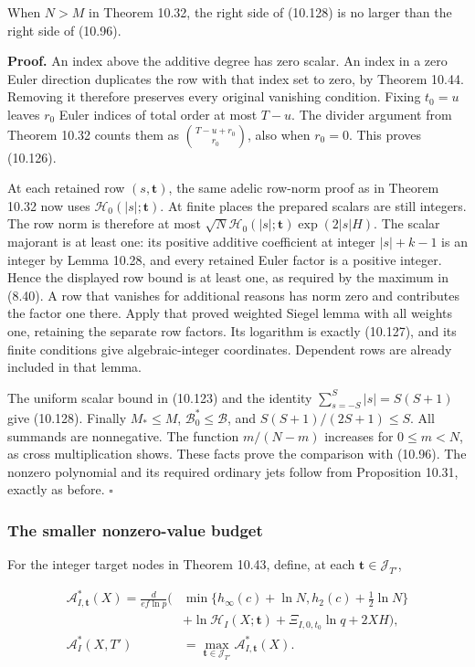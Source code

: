 \documentclass[
  11pt,
  a4paper,
]{article}
\begin{document}
When \(N>M\) in Theorem 10.32, the right side of (10.128) is no larger
than the right side of (10.96).

\textbf{Proof.} An index above the additive degree has zero scalar. An
index in a zero Euler direction duplicates the row with that index set
to zero, by Theorem 10.44. Removing it therefore preserves every
original vanishing condition. Fixing \(t_0=u\) leaves \(r_0\) Euler
indices of total order at most \(T-u\). The divider argument from
Theorem 10.32 counts them as \(\binom{T-u+r_0}{r_0}\), also when
\(r_0=0\). This proves (10.126).

At each retained row \((s,\boldsymbol t)\), the same adelic row-norm
proof as in Theorem 10.32 now uses \(\mathcal H_0(|s|;\boldsymbol t)\).
At finite places the prepared scalars are still integers. The row norm
is therefore at most
\(\sqrt N\mathcal H_0(|s|;\boldsymbol t)\exp(2|s|H)\). The scalar
majorant is at least one: its positive additive coefficient at integer
\(|s|+k-1\) is an integer by Lemma 10.28, and every retained Euler
factor is a positive integer. Hence the displayed row bound is at least
one, as required by the maximum in (8.40). A row that vanishes for
additional reasons has norm zero and contributes the factor one there.
Apply that proved weighted Siegel lemma with all weights one, retaining
the separate row factors. Its logarithm is exactly (10.127), and its
finite conditions give algebraic-integer coordinates. Dependent rows are
already included in that lemma.

The uniform scalar bound in (10.123) and the identity
\(\sum_{s=-S}^S|s|=S(S+1)\) give (10.128). Finally \(M_*\le M\),
\(\mathcal B_0^*\le\mathcal B\), and \(S(S+1)/(2S+1)\le S\). All
summands are nonnegative. The function \(m/(N-m)\) increases for
\(0\le m<N\), as cross multiplication shows. These facts prove the
comparison with (10.96). The nonzero polynomial and its required
ordinary jets follow from Proposition 10.31, exactly as before.
\(\square\)

\subsubsection{The smaller nonzero-value
budget}\label{the-smaller-nonzero-value-budget}

For the integer target nodes in Theorem 10.43, define, at each
\(\boldsymbol t\in\mathcal J_{T'}\),

\[
\begin{aligned}
\mathcal A_{I,\boldsymbol t}^*(X)=\frac d{ef\ln p}\biggl(&
\min\{h_\infty(c)+\ln N,h_2(c)+\tfrac12\ln N\}\\
&+\ln\mathcal H_I(X;\boldsymbol t)
+\Xi_{I,0,t_0}\ln q+2XH\biggr),\\
\mathcal A_I^*(X,T')&=\max_{\boldsymbol t\in\mathcal J_{T'}}
\mathcal A_{I,\boldsymbol t}^*(X).
\end{aligned}
\tag{10.129}
\]
\end{document}
